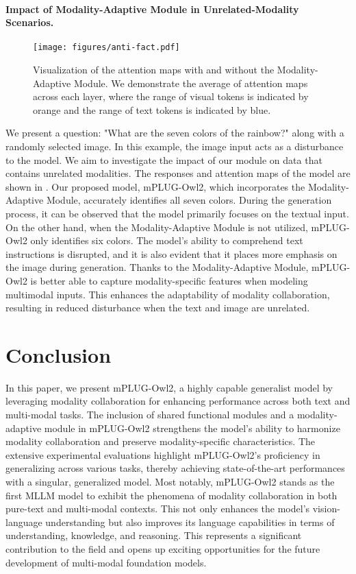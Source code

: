 \documentclass[10pt,twocolumn,letterpaper]{article}
\newcommand{\modelname}{mPLUG-Owl2\xspace}
\begin{document}
\paragraph{Impact of Modality-Adaptive Module in Unrelated-Modality Scenarios.}
\begin{figure}[h]
    \centering
    \texttt{[image: figures/anti-fact.pdf]}
    \caption{Visualization of the attention maps with and without the Modality-Adaptive Module. We demonstrate the average of attention maps across each layer, where the range of visual tokens is indicated by orange and the range of text tokens is indicated by blue.}
    \vspace{-2ex}
    \label{fig:modal-unrelated}
\end{figure}
We present a question: "What are the seven colors of the rainbow?" along with a randomly selected image. In this example, the image input acts as a disturbance to the model. We aim to investigate the impact of our module on data that contains unrelated modalities. The responses and attention maps of the model are shown in . Our proposed model, \modelname, which incorporates the Modality-Adaptive Module, accurately identifies all seven colors. During the generation process, it can be observed that the model primarily focuses on the textual input. On the other hand, when the Modality-Adaptive Module is not utilized, \modelname only identifies six colors. The model's ability to comprehend text instructions is disrupted, and it is also evident that it places more emphasis on the image during generation. Thanks to the Modality-Adaptive Module, \modelname is better able to capture modality-specific features when modeling multimodal inputs. This enhances the adaptability of modality collaboration, resulting in reduced disturbance when the text and image are unrelated.

\section{Conclusion}
In this paper, we present \modelname, a highly capable generalist model by leveraging modality collaboration for enhancing performance across both text and multi-modal tasks. The inclusion of shared functional modules and a modality-adaptive module in \modelname strengthens the model's ability to harmonize modality collaboration and preserve modality-specific characteristics. The extensive experimental evaluations highlight \modelname's proficiency in generalizing across various tasks, thereby achieving state-of-the-art performances with a singular, generalized model. Most notably, \modelname stands as the first MLLM model to exhibit the phenomena of modality collaboration in both pure-text and multi-modal contexts. This not only enhances the model's vision-language understanding but also improves its language capabilities in terms of understanding, knowledge, and reasoning. This represents a significant contribution to the field and opens up exciting opportunities for the future development of multi-modal foundation models.
\end{document}
